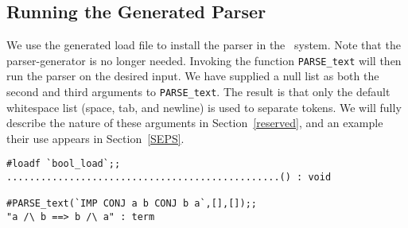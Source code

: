 \subsection{Running the Generated Parser}

We use the generated load file to install the parser in the \HOL\ system.  
Note that
the parser-generator is no longer needed.  Invoking the function 
\verb"PARSE_text"
will then run the parser on the desired input.  We have supplied a null list
as both the second and third arguments to 
\verb"PARSE_text".  
The result is that only the default whitespace list (space, tab, and newline)
is used to separate tokens.  We will fully describe the nature of these 
arguments in Section~\ref{reserved}, and an example their use appears in
Section~\ref{SEPS}.
\setcounter{sessioncount}{1}
\small
\begin{center}
\begin{session}
\begin{verbatim}
#loadf `bool_load`;;
................................................() : void

#PARSE_text(`IMP CONJ a b CONJ b a`,[],[]);;
"a /\ b ==> b /\ a" : term
\end{verbatim}
\end{session}
\end{center}
\normalsize


